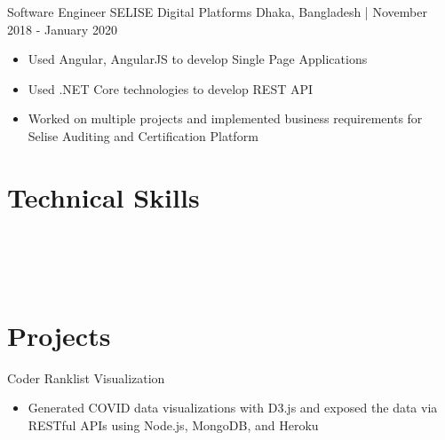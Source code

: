 \documentclass{resumestyle}
\begin{document}
    \vspace{4pt}%


    \worksubsection%
        {Software Engineer}%
        {SELISE Digital Platforms}%
        {Dhaka, Bangladesh | November 2018 - January 2020}%
    
    \begin{itemize}[labelsep=4pt,leftmargin=*,topsep=5pt,partopsep=0pt,itemsep=1pt]%
        \item Used Angular, AngularJS to develop Single Page Applications%
        \item Used .NET Core technologies to develop REST API%
        \item Worked on multiple projects and implemented business requirements for Selise Auditing and Certification Platform%
    \end{itemize}%

    \vspace{56pt}%

\section{Technical Skills}%
\enspace%
\enspace%
\enspace%
\thinspace\thinspace%
\vspace{4pt}\\%
\enspace%
\enspace%
\enspace%
\vspace{4pt}\\%
\thinspace\thinspace%
\thinspace\thinspace%
\enspace%
\enspace%
\vspace{4pt}\\%
\thinspace\thinspace%
\thinspace\thinspace%
\thinspace\thinspace%
%


\section{Projects}%
    
    \projectsubsection%
        {Coder Ranklist}%
        {Visualization \hfill \textit{\href{}{\textcolor{link}{}}}}%
    \begin{itemize}[labelsep=4pt,leftmargin=*,topsep=5pt,partopsep=0pt,itemsep=1pt]%
        \item Generated COVID data visualizations with D3.js and exposed the data via RESTful APIs using Node.js, MongoDB, and Heroku
    \end{itemize}%
\end{document}
